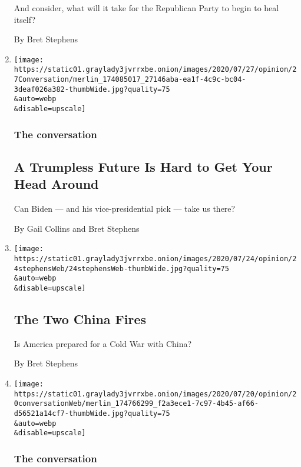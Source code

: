 \begin{enumerate}
  And consider, what will it take for the Republican Party to begin to
  heal itself?

  By Bret Stephens
\item
  \href{/2020/07/27/opinion/biden-trump-2020-vp.html}{}

  \texttt{[image: https://static01.graylady3jvrrxbe.onion/images/2020/07/27/opinion/27Conversation/merlin\_174085017\_27146aba-ea1f-4c9c-bc04-3deaf026a382-thumbWide.jpg?quality=75\\\&auto=webp\\\&disable=upscale]}

  \hypertarget{the-conversation-1}{%
  \subsubsection{The conversation}\label{the-conversation-1}}

  \hypertarget{a-trumpless-future-is-hard-to-get-your-head-around}{%
  \subsection{A Trumpless Future Is Hard to Get Your Head
  Around}\label{a-trumpless-future-is-hard-to-get-your-head-around}}

  Can Biden --- and his vice-presidential pick --- take us there?

  By Gail Collins and Bret Stephens
\item
  \href{/2020/07/24/opinion/china-trump.html}{}

  \texttt{[image: https://static01.graylady3jvrrxbe.onion/images/2020/07/24/opinion/24stephensWeb/24stephensWeb-thumbWide.jpg?quality=75\\\&auto=webp\\\&disable=upscale]}

  \hypertarget{the-two-china-fires}{%
  \subsection{The Two China Fires}\label{the-two-china-fires}}

  Is America prepared for a Cold War with China?

  By Bret Stephens
\item
  \href{/2020/07/21/opinion/trump-portland-coronavirus.html}{}

  \texttt{[image: https://static01.graylady3jvrrxbe.onion/images/2020/07/20/opinion/20conversationWeb/merlin\_174766299\_f2a3ece1-7c97-4b45-af66-d56521a14cf7-thumbWide.jpg?quality=75\\\&auto=webp\\\&disable=upscale]}

  \hypertarget{the-conversation-2}{%
  \subsubsection{The conversation}\label{the-conversation-2}}


\end{enumerate}
